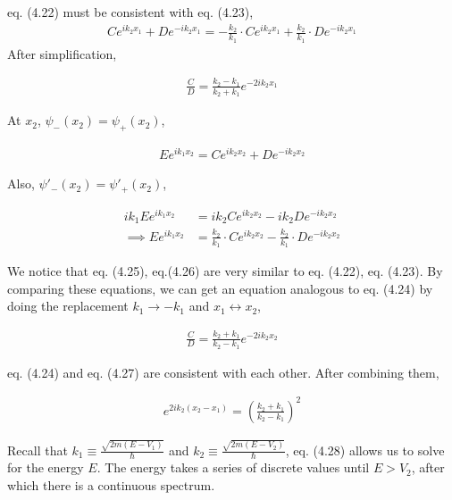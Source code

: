 \documentclass[12pt]{book} %
\numberwithin{equation}{chapter}
\begin{document}
eq. (4.22) must be consistent with eq. (4.23),
\begin{align*}
Ce^{ik_{2}x_{1}}+De^{-ik_{2}x_{1}}=-\frac{k_{2}}{k_{1}}\cdot Ce^{ik_{2}x_{1}}+\frac{k_{2}}{k_{1}}\cdot De^{-ik_{2}x_{1}}
\end{align*}
After simplification,
\begin{eqnbox}
\begin{align}
\frac{C}{D}=\frac{k_{2}-k_{1}}{k_{2}+k_{1}}e^{-2ik_{2}x_{1}}
\end{align}
\end{eqnbox}
At $x_{2}$, $\psi_{-}(x_{2})=\psi_{+}(x_{2})$,
\begin{eqnbox}
\begin{align}
Ee^{ik_{1}x_{2}}=Ce^{ik_{2}x_{2}}+De^{-ik_{2}x_{2}}
\end{align}
\end{eqnbox}
\pagebreak
Also, $\psi'_{-}(x_{2})=\psi'_{+}(x_{2})$,
\begin{eqnbox}
\begin{align}
ik_{1}Ee^{ik_{1}x_{2}}&=ik_{2}Ce^{ik_{2}x_{2}}-ik_{2}De^{-ik_{2}x_{2}}\nonumber\\
\implies Ee^{ik_{1}x_{2}}&=\frac{k_{2}}{k_{1}}\cdot Ce^{ik_{2}x_{2}}-\frac{k_{2}}{k_{1}}\cdot De^{-ik_{2}x_{2}}
\end{align}
\end{eqnbox}
We notice that eq. (4.25), eq.(4.26) are very similar to eq. (4.22), eq. (4.23). By comparing these equations, we can get an equation analogous to eq. (4.24) by doing the replacement $k_{1}\to-k_{1}$ and $x_{1}\leftrightarrow x_{2}$,
\begin{eqnbox}
\begin{align}
\frac{C}{D}=\frac{k_{2}+k_{1}}{k_{2}-k_{1}}e^{-2ik_{2}x_{2}}
\end{align}
\end{eqnbox}
eq. (4.24) and eq. (4.27) are consistent with each other. After combining them,
\begin{eqnbox}
\begin{align}
e^{2ik_{2}(x_{2}-x_{1})}={\left(\frac{k_{2}+k_{1}}{k_{2}-k_{1}}\right)}^{2}
\end{align}
\end{eqnbox}
Recall that $k_{1}\equiv\frac{\sqrt{2m(E-V_{1})}}{\hbar}$ and $k_{2}\equiv\frac{\sqrt{2m(E-V_{2})}}{\hbar}$, eq. (4.28) allows us to solve for the energy $E$. The energy takes a series of discrete values until $E>V_{2}$, after which there is a continuous spectrum.
\end{document}

